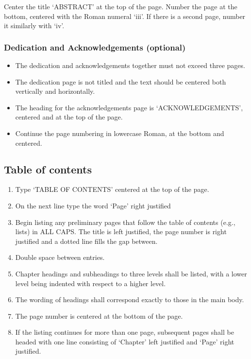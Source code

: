     Center the title `ABSTRACT' at the top of the page. Number the page
at the bottom, centered with the Roman numeral `iii'. If there is a second 
page, number it similarly with `iv'.

\subsubsection{Dedication and Acknowledgements (optional)}

\begin{itemize}
\item  The dedication and acknowledgements together must not exceed three 
pages.
\item The dedication page is not titled and the text should be centered both
vertically and horizontally.
\item The heading for the acknowledgements page is `ACKNOWLEDGEMENTS', centered
and at the top of the page.
\item Continue the page numbering in lowercase Roman, at the bottom and 
centered.
\end{itemize}

\subsection{Table of contents}

\begin{enumerate}
\item Type `TABLE OF CONTENTS' centered at the top of the page.
\item On the next line type the word `Page' right justified
\item Begin listing any preliminary pages that follow the table of contents
(e.g., lists) in ALL CAPS. The title is left justified, the page number is
right justified and a dotted line fills the gap between.
\item Double space between entries.
\item Chapter headings and subheadings to three levels shall be listed, 
with a lower level being indented with respect to a higher level. 
\item The wording of headings shall correspond exactly to those in
the main body.
\item The page number is centered at the bottom of the page.
\item If the listing continues for more than one page, subsequent pages
shall be headed with one line consisting of `Chapter' left justified 
and `Page' right justified.
\end{enumerate}

